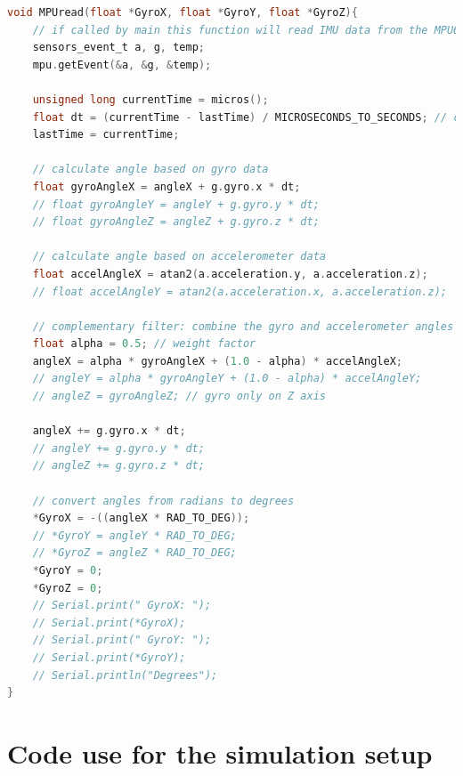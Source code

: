 \documentclass{article}
\begin{document}
\begin{lstlisting}[language=C, caption=Arduino Nano Code]
void MPUread(float *GyroX, float *GyroY, float *GyroZ){
    // if called by main this function will read IMU data from the MPU6050 and return it
    sensors_event_t a, g, temp;
    mpu.getEvent(&a, &g, &temp);

    unsigned long currentTime = micros();
    float dt = (currentTime - lastTime) / MICROSECONDS_TO_SECONDS; // convert to seconds
    lastTime = currentTime;

    // calculate angle based on gyro data
    float gyroAngleX = angleX + g.gyro.x * dt;
    // float gyroAngleY = angleY + g.gyro.y * dt;
    // float gyroAngleZ = angleZ + g.gyro.z * dt;

    // calculate angle based on accelerometer data
    float accelAngleX = atan2(a.acceleration.y, a.acceleration.z);
    // float accelAngleY = atan2(a.acceleration.x, a.acceleration.z);

    // complementary filter: combine the gyro and accelerometer angles
    float alpha = 0.5; // weight factor
    angleX = alpha * gyroAngleX + (1.0 - alpha) * accelAngleX;
    // angleY = alpha * gyroAngleY + (1.0 - alpha) * accelAngleY;
    // angleZ = gyroAngleZ; // gyro only on Z axis

    angleX += g.gyro.x * dt;
    // angleY += g.gyro.y * dt;
    // angleZ += g.gyro.z * dt;

    // convert angles from radians to degrees
    *GyroX = -((angleX * RAD_TO_DEG));
    // *GyroY = angleY * RAD_TO_DEG;
    // *GyroZ = angleZ * RAD_TO_DEG;
    *GyroY = 0;
    *GyroZ = 0;
    // Serial.print(" GyroX: ");
    // Serial.print(*GyroX);
    // Serial.print(" GyroY: ");
    // Serial.print(*GyroY);
    // Serial.println("Degrees");
}
\end{lstlisting}
\newpage
\section{Code use for the simulation setup}
\end{document}

